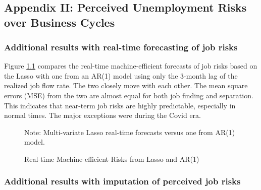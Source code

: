 
\chapter{}

\section{Appendix II: Perceived Unemployment Risks over Business Cycles }
\label{append:two}


\subsection{Additional results with real-time forecasting of job risks}
\label{appendix:real_time_results_more}


Figure \ref{fig:real_time_ar} compares the real-time machine-efficient forecasts of job risks based on the Lasso with one from an AR(1) model using only the 3-month lag of the realized job flow rate. The two closely move with each other. The mean square errors (MSE) from the two are almost equal for both job finding and separation. This indicates that near-term job risks are highly predictable, especially in normal times. The major exceptions were during the Covid era. 

 \begin{figure}[ht]
    	\caption{Real-time Machine-efficient Risks from Lasso and AR(1)}
    	\label{fig:real_time_ar}
    	\begin{center}
    	\end{center}
    	
    	\begin{flushleft}\footnotesize{Note: Multi-variate Lasso real-time forecasts versus one from AR(1) model.}\end{flushleft}
    \end{figure}


\subsection{Additional results with imputation of perceived job risks}



